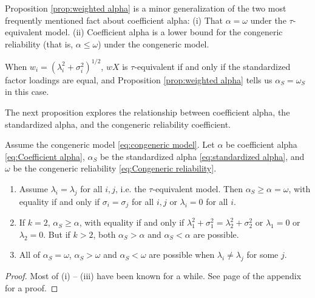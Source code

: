\documentclass[twoside]{article}
\renewcommand{\sqrt}[1]{{(#1)^{1/2}}}
\begin{document}

Proposition \ref{prop:weighted alpha} is a minor generalization of the two most frequently mentioned fact about coefficient alpha: (i) That $\alpha = \omega$ under the $\tau$-equivalent model. (ii) Coefficient alpha is a lower bound for the congeneric reliability (that is, $\alpha \leq \omega$) under the congeneric model.
 
When $w_{i}=\sqrt{\lambda_{i}^{2}+\sigma_{i}^{2}}$, $wX$ is $\tau$-equivalent if and only if the standardized factor loadings are equal, and Proposition \ref{prop:weighted alpha} tells us $\alpha_S = \omega_S$ in this case. 

The next proposition explores the relationship between coefficient alpha, the standardized alpha, and the congeneric reliability coefficient.

\begin{prop}
\label{prop:Reliabilities.}Assume the congeneric model \eqref{eq:congeneric model}. Let $\alpha$ be coefficient alpha \eqref{eq:Coefficient alpha}, $\alpha_S$ be the standardized alpha \eqref{eq:standardized alpha}, and  $\omega$ be the congeneric reliability \eqref{eq:Congeneric reliability}. 
\begin{enumerate}[label=(\roman*)]
\item Assume $\lambda_{i}=\lambda_{j}$ for all $i,j$, i.e. the $\tau$-equivalent model. Then $\alpha_S \geq \alpha = \omega$, with equality if and only if $\sigma_{i}=\sigma_{j}$ for all $i,j$ or $\lambda_i = 0$ for all $i$.
\item If $k=2$, $\alpha_S\geq\alpha$, with equality if and only if $\lambda_{1}^{2}+\sigma_{1}^{2}=\lambda_{2}^{2}+\sigma_{2}^{2}$ or $\lambda_1 = 0$ or $\lambda_2 = 0$. But if $k>2$, both $\alpha_S>\alpha$
and $\alpha_S<\alpha$ are possible.
\item All of $\alpha_S=\omega$, $\alpha_S>\omega$ and $\alpha_S<\omega$
are possible when $\lambda_{i}\neq\lambda_{j}$ for some $j$.
\end{enumerate}
\end{prop}
\begin{proof}
Most of (i) -- (iii) have been known for a while. See page \pageref{proof:Reliabilities.} of the appendix for a proof.
\end{proof}
\end{document}
